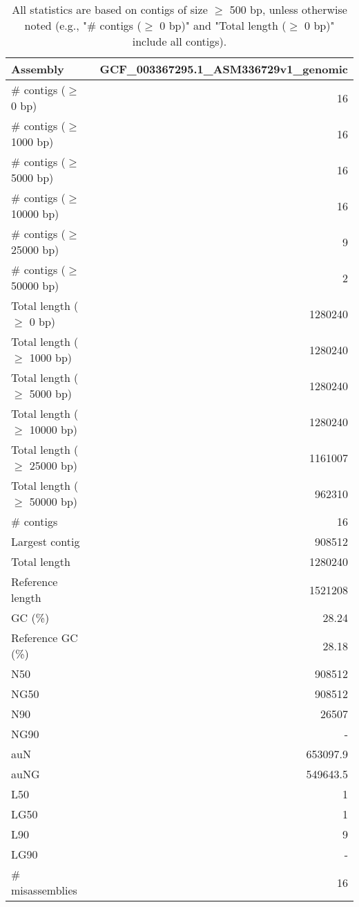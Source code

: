 \documentclass[12pt,a4paper]{article}
\begin{document}
\begin{table}[ht]
\begin{center}
\caption{All statistics are based on contigs of size $\geq$ 500 bp, unless otherwise noted (e.g., "\# contigs ($\geq$ 0 bp)" and "Total length ($\geq$ 0 bp)" include all contigs).}
\begin{tabular}{|l*{1}{|r}|}
\hline
Assembly & GCF\_003367295.1\_ASM336729v1\_genomic \\ \hline
\# contigs ($\geq$ 0 bp) & 16 \\ \hline
\# contigs ($\geq$ 1000 bp) & 16 \\ \hline
\# contigs ($\geq$ 5000 bp) & 16 \\ \hline
\# contigs ($\geq$ 10000 bp) & 16 \\ \hline
\# contigs ($\geq$ 25000 bp) & 9 \\ \hline
\# contigs ($\geq$ 50000 bp) & 2 \\ \hline
Total length ($\geq$ 0 bp) & 1280240 \\ \hline
Total length ($\geq$ 1000 bp) & 1280240 \\ \hline
Total length ($\geq$ 5000 bp) & 1280240 \\ \hline
Total length ($\geq$ 10000 bp) & 1280240 \\ \hline
Total length ($\geq$ 25000 bp) & 1161007 \\ \hline
Total length ($\geq$ 50000 bp) & 962310 \\ \hline
\# contigs & 16 \\ \hline
Largest contig & 908512 \\ \hline
Total length & 1280240 \\ \hline
Reference length & 1521208 \\ \hline
GC (\%) & 28.24 \\ \hline
Reference GC (\%) & 28.18 \\ \hline
N50 & 908512 \\ \hline
NG50 & 908512 \\ \hline
N90 & 26507 \\ \hline
NG90 & - \\ \hline
auN & 653097.9 \\ \hline
auNG & 549643.5 \\ \hline
L50 & 1 \\ \hline
LG50 & 1 \\ \hline
L90 & 9 \\ \hline
LG90 & - \\ \hline
\# misassemblies & 16 \\ \hline

\end{tabular}
\end{center}
\end{table}
\end{document}
